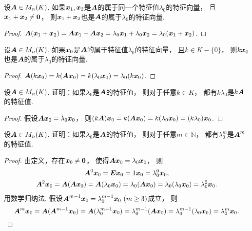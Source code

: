\begin{proposition}\label{theorem:矩阵的特征值与特征向量.特征子空间1}
设\(\boldsymbol{A} \in M_n(K)\).
如果\(\boldsymbol{x}_1,\boldsymbol{x}_2\)是\(\boldsymbol{A}\)的属于同一个特征值\(\lambda_0\)的特征向量，
且\(\boldsymbol{x}_1 + \boldsymbol{x}_2 \neq \boldsymbol0\)，
则\(\boldsymbol{x}_1 + \boldsymbol{x}_2\)也是\(\boldsymbol{A}\)的属于\(\lambda_0\)的特征向量.
\begin{proof}
\(\boldsymbol{A} (\boldsymbol{x}_1 + \boldsymbol{x}_2)
= \boldsymbol{A} \boldsymbol{x}_1 + \boldsymbol{A} \boldsymbol{x}_2
= \lambda_0 \boldsymbol{x}_1 + \lambda_0 \boldsymbol{x}_2
= \lambda_0 (\boldsymbol{x}_1 + \boldsymbol{x}_2)\).
\end{proof}
\end{proposition}
\begin{proposition}\label{theorem:矩阵的特征值与特征向量.特征子空间2}
设\(\boldsymbol{A} \in M_n(K)\).
如果\(\boldsymbol{x}_0\)是\(\boldsymbol{A}\)的属于特征值\(\lambda_0\)的特征向量，
且\(k \in K-\{0\}\)，
则\(k \boldsymbol{x}_0\)也是\(\boldsymbol{A}\)的属于\(\lambda_0\)的特征向量.
\begin{proof}
\(\boldsymbol{A} (k \boldsymbol{x}_0)
= k (\boldsymbol{A} \boldsymbol{x}_0)
= k (\lambda_0 \boldsymbol{x}_0)
= \lambda_0 (k \boldsymbol{x}_0)\).
\end{proof}
\end{proposition}
\begin{example}\label{example:矩阵的特征值与特征向量.矩阵的多项式的特征值1}
设\(\boldsymbol{A} \in M_n(K)\).
证明：如果\(\lambda_0\)是\(\boldsymbol{A}\)的特征值，
则对于任意\(k \in K\)，
都有\(k\lambda_0\)是\(k\boldsymbol{A}\)的特征值.
\begin{proof}
假设\(\boldsymbol{A} \boldsymbol{x}_0 = \lambda_0 \boldsymbol{x}_0\)，
则\((k\boldsymbol{A}) \boldsymbol{x}_0
= k(\boldsymbol{A} \boldsymbol{x}_0)
= k(\lambda_0 \boldsymbol{x}_0)
= (k\lambda_0) \boldsymbol{x}_0\).
\end{proof}
\end{example}
\begin{example}\label{example:矩阵的特征值与特征向量.矩阵的多项式的特征值2}
设\(\boldsymbol{A} \in M_n(K)\).
证明：如果\(\lambda_0\)是\(\boldsymbol{A}\)的特征值，
则对于任意\(m\in\mathbb{N}\)，
都有\(\lambda_0^m\)是\(\boldsymbol{A}^m\)的特征值.
\begin{proof}
由定义，存在\(\boldsymbol{x}_0\neq\boldsymbol0\)，
使得\(\boldsymbol{A}\boldsymbol{x}_0 = \lambda_0\boldsymbol{x}_0\)，
则\begin{gather*}
	\boldsymbol{A}^0 \boldsymbol{x}_0
	= \boldsymbol{E} \boldsymbol{x}_0
	= 1 \boldsymbol{x}_0
	= \lambda_0^0 \boldsymbol{x}_0, \\
	\boldsymbol{A}^2\boldsymbol{x}_0 = \boldsymbol{A}(\boldsymbol{A}\boldsymbol{x}_0)
	= \boldsymbol{A}(\lambda_0\boldsymbol{x}_0)
	= \lambda_0(\boldsymbol{A}\boldsymbol{x}_0)
	= \lambda_0(\lambda_0\boldsymbol{x}_0)
	= \lambda_0^2\boldsymbol{x}_0.
\end{gather*}
用数学归纳法.
假设\(\vb{A}^{m-1}\vb{x}_0 = \lambda_0^{m-1}\vb{x}_0\ (m\geq3)\)成立，
则\[
	\boldsymbol{A}^m\boldsymbol{x}_0 = \boldsymbol{A}(\boldsymbol{A}^{m-1}\boldsymbol{x}_0)
	= \boldsymbol{A}(\lambda_0^{m-1}\boldsymbol{x}_0)
	= \lambda_0^{m-1}(\boldsymbol{A}\boldsymbol{x}_0)
	= \lambda_0^{m-1}(\lambda_0\boldsymbol{x}_0)
	= \lambda_0^m\boldsymbol{x}_0.
	\qedhere
\]
\end{proof}
\end{example}
